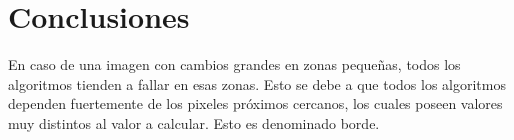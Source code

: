 \section{Conclusiones}

En caso de una imagen con cambios grandes en zonas pequeñas, todos los algoritmos tienden a fallar en esas zonas.
Esto se debe a que todos los algoritmos dependen fuertemente de los pixeles próximos cercanos, los cuales poseen valores muy distintos al valor a calcular. Esto es denominado borde.